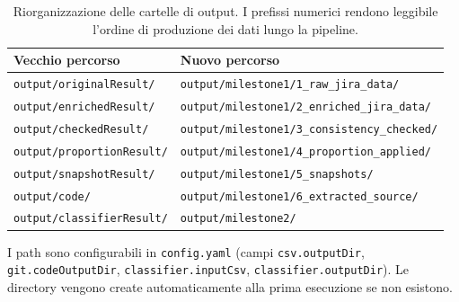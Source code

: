 \begin{table}[h!]
\centering
\small
\begin{tabular}{@{}ll@{}}
\toprule
\textbf{Vecchio percorso} & \textbf{Nuovo percorso} \\
\midrule
\texttt{output/originalResult/}   & \texttt{output/milestone1/1\_raw\_jira\_data/} \\
\texttt{output/enrichedResult/}   & \texttt{output/milestone1/2\_enriched\_jira\_data/} \\
\texttt{output/checkedResult/}    & \texttt{output/milestone1/3\_consistency\_checked/} \\
\texttt{output/proportionResult/} & \texttt{output/milestone1/4\_proportion\_applied/} \\
\texttt{output/snapshotResult/}   & \texttt{output/milestone1/5\_snapshots/} \\
\texttt{output/code/}             & \texttt{output/milestone1/6\_extracted\_source/} \\
\texttt{output/classifierResult/} & \texttt{output/milestone2/} \\
\bottomrule
\end{tabular}
\caption{Riorganizzazione delle cartelle di output. I prefissi numerici rendono leggibile
l'ordine di produzione dei dati lungo la pipeline.}
\end{table}

I path sono configurabili in \texttt{config.yaml} (campi \texttt{csv.outputDir},
\texttt{git.codeOutputDir}, \texttt{classifier.inputCsv}, \texttt{classifier.outputDir}).
Le directory vengono create automaticamente alla prima esecuzione se non esistono.
